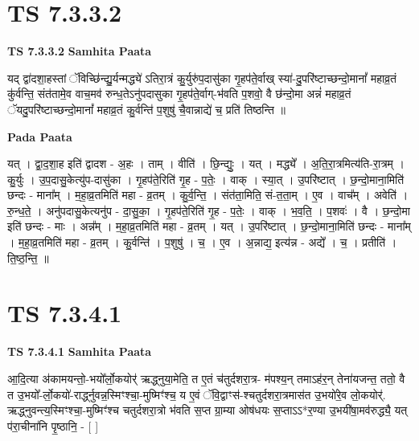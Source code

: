 \documentclass[17pt]{extarticle}
\begin{document}
\section*{ TS 7.3.3.2 }

\textbf{TS 7.3.3.2 } \newline
\textbf{Samhita Paata} \newline

यद् द्वा॑दशा॒हस्तां ॅविच्छि॑न्द्यु॒र्यन्मद्ध्ये॑ ऽतिरा॒त्रं कु॒र्युरु॑प॒दासु॑का गृ॒हप॑ते॒र्वाख् स्या॑-दु॒परि॑ष्टाच्छन्दो॒मानां᳚ महाव्र॒तं कु॑र्वन्ति॒ संत॑तामे॒व वाच॒मव॑ रुन्ध॒तेऽनु॑पदासुका गृ॒हप॑ते॒र्वाग्-भ॑वति प॒शवो॒ वै छ॑न्दो॒मा अन्नं॑ महाव्र॒तं ॅयदु॒परि॑ष्टाच्छन्दो॒मानां᳚ महाव्र॒तं कु॒र्वन्ति॑ प॒शुषु॑ चै॒वान्नाद्ये॑ च॒ प्रति॑ तिष्ठन्ति ॥ \newline

\textbf{Pada Paata} \newline

यत् । द्वा॒द॒शा॒ह इति॑ द्वादश - अ॒हः । ताम् । वीति॑ । छि॒न्द्युः॒ । यत् । मद्ध्ये᳚ । अ॒ति॒रा॒त्रमित्य॑ति-रा॒त्रम् । कु॒र्युः । उ॒प॒दासु॒केत्यु॑प-दासु॑का । गृ॒हप॑ते॒रिति॑ गृ॒ह - प॒तेः॒ । वाक् । स्या॒त् । उ॒परि॑ष्टात् । छ॒न्दो॒माना॒मिति॑ छन्दः - माना᳚म् । म॒हा॒व्र॒तमिति॑ महा - व्र॒तम् । कु॒र्व॒न्ति॒ । संत॑ता॒मिति॒ सं-त॒ता॒म् । ए॒व । वाच᳚म् । अवेति॑ । रु॒न्ध॒ते॒ । अनु॑पदासु॒केत्यनु॑प - दा॒सु॒का॒ । गृ॒हप॑ते॒रिति॑ गृ॒ह - प॒तेः॒ । वाक् । भ॒व॒ति॒ । प॒शवः॑ । वै । छ॒न्दो॒मा इति॑ छन्दः - माः । अन्न᳚म् । म॒हा॒व्र॒तमिति॑ महा - व्र॒तम् । यत् । उ॒परि॑ष्टात् । छ॒न्दो॒माना॒मिति॑ छन्दः - माना᳚म् । म॒हा॒व्र॒तमिति॑ महा - व्र॒तम् । कु॒र्वन्ति॑ । प॒शुषु॑ । च॒ । ए॒व । अ॒न्नाद्य॒ इत्य॑न्न - अद्ये᳚ । च॒ । प्रतीति॑ । ति॒ष्ठ॒न्ति॒ ॥  \newline




\section*{ TS 7.3.4.1 }

\textbf{TS 7.3.4.1 } \newline
\textbf{Samhita Paata} \newline

आ॒दि॒त्या अ॑कामयन्तो॒-भयो᳚र्लो॒कयोर्॑ ऋद्ध्नुया॒मेति॒ त ए॒तं च॑तुर्दशरा॒त्र- म॑पश्य॒न् तमाऽह॑र॒न् तेना॑यजन्त॒ ततो॒ वै त उ॒भयो᳚-र्लो॒कयो॑-रार्द्ध्नुवन्न॒स्मिꣳश्चा॒-मुष्मिꣳ॑श्च॒ य ए॒वं ॅवि॒द्वाꣳस॑-श्चतुर्दशरा॒त्रमास॑त उ॒भयो॑रे॒व लो॒कयोर्॑. ऋद्ध्नुवन्त्य॒स्मिꣳश्चा॒-मुष्मिꣳ॑श्च चतुर्दशरा॒त्रो भ॑वति स॒प्त ग्रा॒म्या ओष॑धयः स॒प्ताऽऽ*र॒ण्या उ॒भयी॑षा॒मव॑रुद्ध्यै॒ यत् प॑रा॒चीना॑नि पृ॒ष्ठानि॒ - [  ] \newline
\end{document}
